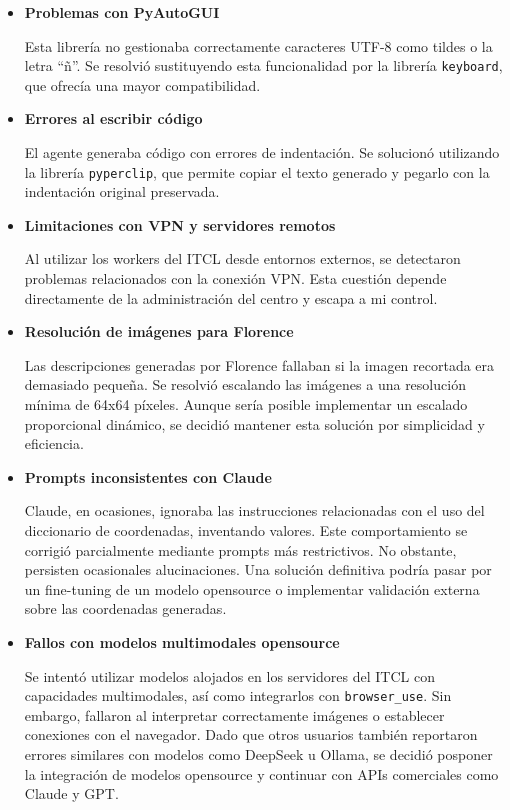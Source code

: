 \begin{itemize}
    \item \textbf{Problemas con PyAutoGUI} 
    
    Esta librería no gestionaba correctamente caracteres UTF-8 como tildes o la letra “ñ”. Se resolvió sustituyendo esta funcionalidad por la librería \texttt{keyboard}, que ofrecía una mayor compatibilidad.

    \item \textbf{Errores al escribir código} 
    
    El agente generaba código con errores de indentación. Se solucionó utilizando la librería \texttt{pyperclip}, que permite copiar el texto generado y pegarlo con la indentación original preservada.

    \item \textbf{Limitaciones con VPN y servidores remotos} 
    
    Al utilizar los workers del ITCL desde entornos externos, se detectaron problemas relacionados con la conexión VPN. Esta cuestión depende directamente de la administración del centro y escapa a mi control.

    \item \textbf{Resolución de imágenes para Florence} 
    
    Las descripciones generadas por Florence fallaban si la imagen recortada era demasiado pequeña. Se resolvió escalando las imágenes a una resolución mínima de 64x64 píxeles. Aunque sería posible implementar un escalado proporcional dinámico, se decidió mantener esta solución por simplicidad y eficiencia.

    \item \textbf{Prompts inconsistentes con Claude} 
    
    Claude, en ocasiones, ignoraba las instrucciones relacionadas con el uso del diccionario de coordenadas, inventando valores. Este comportamiento se corrigió parcialmente mediante prompts más restrictivos. No obstante, persisten ocasionales alucinaciones. Una solución definitiva podría pasar por un fine-tuning de un modelo opensource o implementar validación externa sobre las coordenadas generadas.

    \item \textbf{Fallos con modelos multimodales opensource} 
    
    Se intentó utilizar modelos alojados en los servidores del ITCL con capacidades multimodales, así como integrarlos con \texttt{browser\_use}. Sin embargo, fallaron al interpretar correctamente imágenes o establecer conexiones con el navegador. Dado que otros usuarios también reportaron errores similares con modelos como DeepSeek u Ollama, se decidió posponer la integración de modelos opensource y continuar con APIs comerciales como Claude y GPT.
    
\end{itemize}

